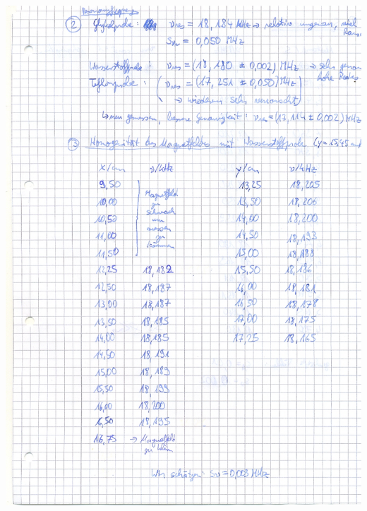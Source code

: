 \begin{appendix}
\centering \includegraphics[width = \textwidth]{appendix/scan0003.jpg}

\end{appendix}
